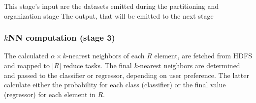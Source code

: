 \begin{algorithm}[!ht]
	\DontPrintSemicolon
	\begin{footnotesize}
	\Comment This stage's input are the datasets emitted during the partitioning and organization stage \;
	\Comment The output, that will be emitted to the next stage \;
	\BlankLine
	\end{footnotesize}
	\caption{FML-$k$NN (stage 2).}
	\label{alg:single_session_algorithm_stage2}
\end{algorithm}

\subsubsection{\texorpdfstring{$k$}NNN computation (stage 3)}
\label{par:algorithmic3}
The calculated  $\alpha \times k$-nearest neighbors of each $R$ element, are fetched from HDFS and mapped to $|R|$ reduce tasks. The final $k$-nearest neighbors are determined and passed to the classifier or regressor, depending on user preference. The latter calculate either the probability for each class (classifier) or the final value (regressor) for each element in $R$.

